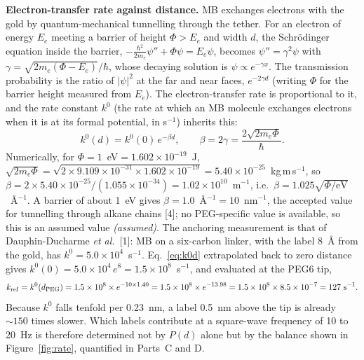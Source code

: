 \documentclass[10pt,a4paper]{article}
\numberwithin{equation}{section}
\newcommand{\cit}[1]{[#1]}
\newcommand{\kzero}{k^0}
\newcommand{\kref}{k_{\rm ref}}
\newcommand{\FLAG}{\textit{(assumed)}}
\newcommand{\figref}[1]{Figure~\ref{#1}}
\newcommand{\betaNM}{10}
\newcommand{\dPEG}{1.40}
\newcommand{\kRef}{127}
\newcommand{\kZero}{\ensuremath{1.5\times10^{8}}}
\begin{document}
\textbf{Electron-transfer rate against distance.} MB exchanges electrons with the gold by
quantum-mechanical tunnelling through the tether. For an electron of energy $E_e$ meeting a barrier of height $\Phi>E_e$ and width $d$, the
Schr\"odinger equation inside the barrier, $-\frac{\hbar^2}{2m_e}\psi''+\Phi\psi=E_e\psi$, becomes
$\psi''=\gamma^2\psi$ with $\gamma=\sqrt{2m_e(\Phi-E_e)}/\hbar$, whose decaying solution is $\psi\propto e^{-\gamma x}$. The
transmission probability is the ratio of $|\psi|^2$ at the far and near faces, $e^{-2\gamma d}$ (writing $\Phi$ for the barrier height
measured from $E_e$). The electron-transfer rate is proportional to it, and the rate constant $\kzero$ (the rate at which
an MB molecule exchanges electrons when it is at its formal potential, in s$^{-1}$)
inherits this:
\begin{equation}
  \kzero(d)=\kzero(0)\,e^{-\beta d},\qquad \beta=2\gamma=\frac{2\sqrt{2m_e\Phi}}{\hbar}.
  \label{eq:k0d}
\end{equation}
Numerically, for $\Phi=1$~eV$=1.602\times10^{-19}$~J, $\sqrt{2m_e\Phi}=\sqrt{2\times9.109\times10^{-31}\times1.602\times10^{-19}}=5.40\times10^{-25}$~kg\,m\,s$^{-1}$, so
$\beta=2\times5.40\times10^{-25}/(1.055\times10^{-34})=1.02\times10^{10}$~m$^{-1}$, i.e.\ $\beta=1.025\sqrt{\Phi/\text{eV}}$~\AA$^{-1}$. A barrier of about 1~eV gives
$\beta=1.0$~\AA$^{-1}=\betaNM$~nm$^{-1}$, the accepted value for
tunnelling through alkane chains \cit{4}; no PEG-specific value is available, so this
is an assumed value \FLAG. The anchoring measurement is that of Dauphin-Ducharme
\emph{et al.}\ \cit{1}: MB on a six-carbon linker, with the label 8~\AA{} from the gold, has
$\kzero=5.0\times10^{4}$~s$^{-1}$. Eq.~\eqref{eq:k0d} extrapolated back to zero distance gives
$\kzero(0)=5.0\times10^4\,e^{8}=\kZero$~s$^{-1}$, and evaluated at the PEG6 tip,
\begin{equation}
  \kref=\kzero(d_{\rm PEG})=\kZero\times e^{-\betaNM\times\dPEG}=\kZero\times e^{-13.98}=\kZero\times8.5\times10^{-7}=\kRef~\text{s}^{-1}.
  \label{eq:kref}
\end{equation}
Because $\kzero$ falls tenfold per 0.23~nm, a label 0.5~nm above the tip is already
$\sim150$ times slower. Which labels contribute at a square-wave frequency of 10 to 20~Hz is
therefore determined not by $P(d)$ alone but by the balance shown in \figref{fig:rate}, quantified in Parts~C and D.
\end{document}
